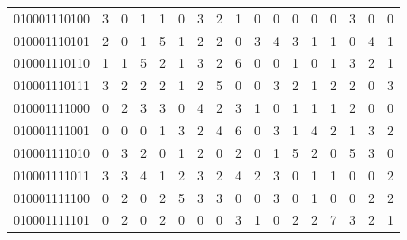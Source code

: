 \documentclass[10pt,a4paper]{article}
\begin{document}
\begin{longtable}{ |c|c|c|c|c|c|c|c|c|c|c|c|c|c|c|c|c| }
    010001110100              & 3                            & 0                                & 1                            & 1                              & 0   & 3   & 2   & 1   & 0   & 0   & 0   & 0   & 0   & 3   & 0   & 0   \\
    010001110101              & 2                            & 0                                & 1                            & 5                              & 1   & 2   & 2   & 0   & 3   & 4   & 3   & 1   & 1   & 0   & 4   & 1   \\
    010001110110              & 1                            & 1                                & 5                            & 2                              & 1   & 3   & 2   & 6   & 0   & 0   & 1   & 0   & 1   & 3   & 2   & 1   \\
    010001110111              & 3                            & 2                                & 2                            & 2                              & 1   & 2   & 5   & 0   & 0   & 3   & 2   & 1   & 2   & 2   & 0   & 3   \\
    010001111000              & 0                            & 2                                & 3                            & 3                              & 0   & 4   & 2   & 3   & 1   & 0   & 1   & 1   & 1   & 2   & 0   & 0   \\
    010001111001              & 0                            & 0                                & 0                            & 1                              & 3   & 2   & 4   & 6   & 0   & 3   & 1   & 4   & 2   & 1   & 3   & 2   \\
    010001111010              & 0                            & 3                                & 2                            & 0                              & 1   & 2   & 0   & 2   & 0   & 1   & 5   & 2   & 0   & 5   & 3   & 0   \\
    010001111011              & 3                            & 3                                & 4                            & 1                              & 2   & 3   & 2   & 4   & 2   & 3   & 0   & 1   & 1   & 0   & 0   & 2   \\
    010001111100              & 0                            & 2                                & 0                            & 2                              & 5   & 3   & 3   & 0   & 0   & 3   & 0   & 1   & 0   & 0   & 2   & 2   \\
    010001111101              & 0                            & 2                                & 0                            & 2                              & 0   & 0   & 0   & 3   & 1   & 0   & 2   & 2   & 7   & 3   & 2   & 1   \\

\end{longtable}
\end{document}

